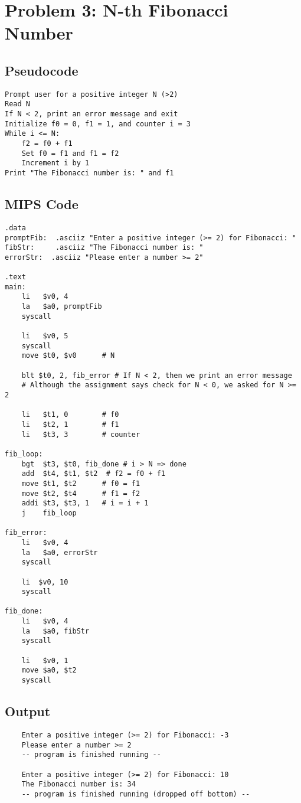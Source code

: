 \documentclass[a4paper]{article}
\begin{document}
\newpage
\section*{Problem 3: N-th Fibonacci Number}
\subsection*{Pseudocode}
\begin{verbatim}
Prompt user for a positive integer N (>2)
Read N
If N < 2, print an error message and exit
Initialize f0 = 0, f1 = 1, and counter i = 3
While i <= N:
    f2 = f0 + f1
    Set f0 = f1 and f1 = f2
    Increment i by 1
Print "The Fibonacci number is: " and f1
\end{verbatim}

\subsection*{MIPS Code}
\begin{verbatim}
.data
promptFib:  .asciiz "Enter a positive integer (>= 2) for Fibonacci: "
fibStr:     .asciiz "The Fibonacci number is: "
errorStr:  .asciiz "Please enter a number >= 2"

.text
main:
    li   $v0, 4
    la   $a0, promptFib
    syscall

    li   $v0, 5
    syscall
    move $t0, $v0      # N
    
    blt $t0, 2, fib_error # If N < 2, then we print an error message
    # Although the assignment says check for N < 0, we asked for N >= 2

    li   $t1, 0        # f0
    li   $t2, 1        # f1
    li   $t3, 3        # counter

fib_loop:
    bgt  $t3, $t0, fib_done # i > N => done
    add  $t4, $t1, $t2  # f2 = f0 + f1
    move $t1, $t2      # f0 = f1
    move $t2, $t4      # f1 = f2
    addi $t3, $t3, 1   # i = i + 1
    j    fib_loop

fib_error:
    li   $v0, 4
    la   $a0, errorStr
    syscall

    li  $v0, 10
    syscall

fib_done:
    li   $v0, 4
    la   $a0, fibStr
    syscall

    li   $v0, 1
    move $a0, $t2
    syscall
\end{verbatim}

\subsection*{Output}
\begin{verbatim}
    Enter a positive integer (>= 2) for Fibonacci: -3
    Please enter a number >= 2
    -- program is finished running --
    
    Enter a positive integer (>= 2) for Fibonacci: 10
    The Fibonacci number is: 34
    -- program is finished running (dropped off bottom) --
\end{verbatim}
\end{document}

